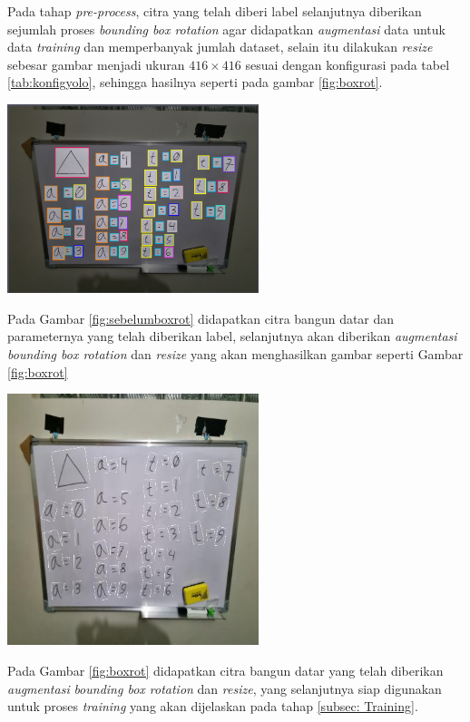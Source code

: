 Pada tahap \textit{pre-process}, citra yang telah diberi label selanjutnya diberikan sejumlah
proses \textit{bounding box rotation} agar didapatkan \textit{augmentasi} data untuk data \textit{training} dan memperbanyak jumlah dataset, selain itu dilakukan \textit{resize} sebesar gambar menjadi ukuran $416 \times 416$ sesuai dengan konfigurasi pada tabel \ref{tab:konfigyolo}, sehingga hasilnya seperti pada gambar \ref{fig:boxrot}.
\begin{center}
	\includegraphics[width=0.55\textwidth]{gambar/labeling.png}
	\label{fig:sebelumboxrot}
\end{center}
Pada Gambar \ref{fig:sebelumboxrot} didapatkan citra bangun datar dan parameternya yang telah diberikan label, selanjutnya akan diberikan \textit{augmentasi} \textit{bounding box rotation} dan \textit{resize} yang akan menghasilkan gambar seperti Gambar \ref{fig:boxrot}

\begin{center}
	\includegraphics[width=0.55\textwidth]{gambar/boxrot.jpg}   
	\label{fig:boxrot}
\end{center}
Pada Gambar \ref{fig:boxrot} didapatkan citra bangun datar yang telah diberikan \textit{augmentasi} \textit{bounding box rotation} dan \textit{resize}, yang selanjutnya siap digunakan untuk proses \textit{training} yang akan dijelaskan pada tahap \ref{subsec: Training}.

